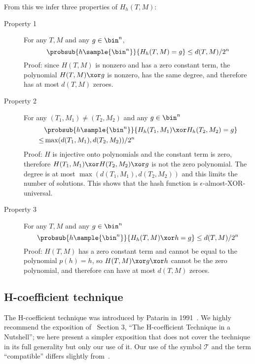 \documentclass[letterpaper,11pt]{article}
\begin{document}
From this we infer three properties of \(H_h(T, M)\):
\begin{description}
    \item[Property 1]
    For any \(T, M\) and any \(g \in \bin^n\),
    \begin{displaymath}
        \probsub{h\sample{\bin^n}}{H_h(T, M) = g} \leq d(T, M)/2^n
    \end{displaymath}
    Proof: since \(H(T, M)\) is nonzero and has
    a zero constant term,
    the polynomial \(H(T, M) \xor g\) 
    is nonzero,
    has the same degree,
    and therefore has at most \(d(T, M)\) zeroes.
    \item[Property 2] 
    For any \((T_1, M_1) \neq (T_2, M_2)\) and any \(g \in \bin^n\)
    \begin{align*}
        & \probsub{h\sample{\bin^n}}{H_h(T_1, M_1) \xor H_h(T_2, M_2) = g} \\
        \leq  & \max(d(T_1, M_1), d(T_2, M_2))/2^n
    \end{align*}
    Proof: \(H\) is injective onto polynomials
    and the constant term is zero, therefore
    \(H(T_1, M_1) \xor H(T_2, M_2) \xor g\)
    is not the zero polynomial.
    The degree is at most \(\max(d(T_1, M_1), d(T_2, M_2))\)
    and this limits the number of solutions.
    This shows that the hash function is
    \(\epsilon\)-almost-XOR-universal.
    \item[Property 3]
    For any \(T, M\) and any \(g \in \bin^n\)
    \begin{displaymath}
        \probsub{h\sample{\bin^n}}{H_h(T, M) \xor h = g} \leq d(T, M)/2^n
    \end{displaymath}
    Proof: \(H(T, M)\) has a zero constant term and
    cannot be equal to the polynomial \(p(h) = h\),
    so \(H(T, M) \xor g \xor h\) cannot be the zero polynomial, and
    therefore can have at most \(d(T, M)\) zeroes.
\end{description}

\subsection{H-coefficient technique}
The H-coefficient technique was introduced by Patarin in 1991~\cite{ppdes,hco}.
We highly recommend the exposition
of~\cite{hco2} Section 3,
``The H-coefficient Technique in a Nutshell'';
we here present a simpler exposition that
does not cover the technique in its full
generality but only our use of it.
Our use of the symbol \(\mathcal{T}\) and the term
``compatible'' differs slightly from~\cite{hco2}.
\end{document}
